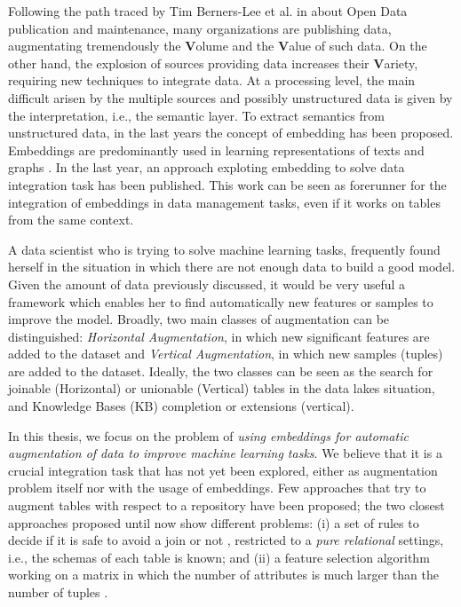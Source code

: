 Following the path traced by Tim Berners-Lee et al. in \cite{bizer2011linked} about Open Data publication and maintenance, many organizations are publishing data, augmentating tremendously the \textbf{V}olume and the \textbf{V}alue of such data. On the other hand, the explosion of sources providing data increases their \textbf{V}ariety, requiring new techniques to integrate data.
At a processing level, the main difficult arisen by the multiple sources and possibly unstructured data is given by the interpretation, i.e., the semantic layer. To extract semantics from unstructured data, in the last years the concept of embedding has been proposed. Embeddings are predominantly used in learning representations of texts \cite{mikolov2013efficient} and graphs \cite{nickel2017poincare}. In the last year, an approach exploting embedding to solve data integration task \cite{cappuzzo2020creating} has been published. This work can be seen as forerunner for the integration of embeddings in data management tasks, even if it works on tables from the same context.

A data scientist who is trying to solve machine learning tasks, frequently found herself in the situation in which there are not enough data to build a good model. Given the amount of data previously discussed, it would be very useful a framework which enables her to find automatically new features or samples to improve the model. Broadly, two main classes of augmentation can be distinguished: \textit{Horizontal Augmentation}, in which new significant features are added to the dataset and \textit{Vertical Augmentation}, in which new samples (tuples) are added to the dataset. Ideally, the two classes can be seen as the search for joinable (Horizontal) or unionable (Vertical) tables in the data lakes situation, and Knowledge Bases (KB) completion or extensions (vertical).

In this thesis, we focus on the problem of \textit{using embeddings for automatic augmentation of data to improve machine learning tasks}. We believe that it is a crucial integration task that has not yet been explored, either as augmentation problem itself nor with the usage of embeddings. Few approaches that try to augment tables with respect to a repository have been proposed; the two closest approaches proposed until now show different problems: (i) a set of rules to decide if it is safe to avoid a join or not \cite{kumar2016join}, restricted to a \textit{pure relational} settings, i.e., the schemas of each table is known; and (ii) a feature selection algorithm working on a matrix in which the number of attributes is much larger than the number of tuples \cite{chepurko2020arda}. 

